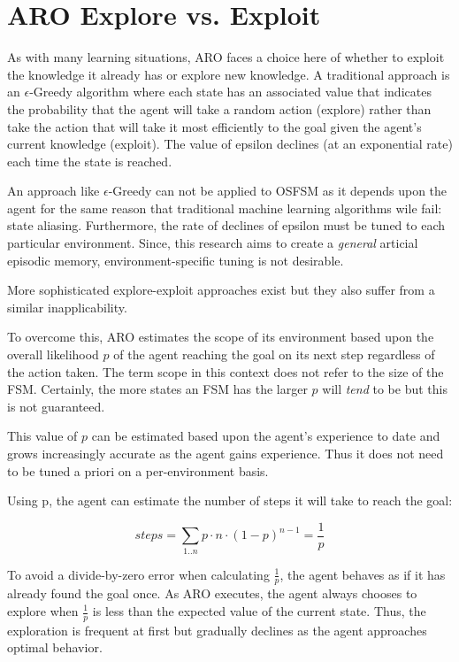 \documentclass[letterpaper]{article} %
\begin{document}
\section{ARO Explore vs. Exploit}

   
As with many learning situations, ARO faces a choice here of whether
to exploit the knowledge it already has or explore new knowledge.  A
traditional approach is an $\epsilon$-Greedy algorithm where each state
has an associated value that indicates the probability that the agent
will take a random action (explore) rather than take the action that
will take it most efficiently to the goal given the agent's current
knowledge (exploit).  The value of epsilon declines (at an exponential
rate) each time the state is reached.

An approach like $\epsilon$-Greedy can not be applied to OSFSM as it
depends upon the agent for the same reason that traditional machine
learning algorithms wile fail: state aliasing.  Furthermore, the rate
of declines of epsilon must be tuned to each particular environment.
Since, this research aims to create a \textit{general} articial
episodic memory, environment-specific tuning is not desirable.

More sophisticated explore-exploit approaches exist \cite{Kearns99,Brafman02}
but they also suffer from a similar inapplicability.


To overcome this, ARO estimates the scope of its environment based
upon the overall likelihood $p$ of the agent reaching the goal on its
next step regardless of the action taken.  The term scope in this
context does not refer to the size of the FSM.  Certainly, the more
states an FSM has the larger $p$ will \textit{tend} to be but this is
not guaranteed.

This value of $p$ can be estimated based upon the agent's experience
to date and grows increasingly accurate as the agent gains
experience.  Thus it does not need to be tuned a priori on a
per-environment basis.

Using p, the agent can estimate the number of steps it will take to
reach the goal:

\begin{center}
     $$steps = \sum_{1..n} p \cdot n \cdot (1-p)^{n-1}  = \frac{1}{p}$$
\end{center}


To avoid a divide-by-zero error when calculating $\frac{1}{p}$, the
agent behaves as if it has already found the goal once.  As ARO
executes, the agent always chooses to explore when $\frac{1}{p}$ is
less than the expected value of the current state.  Thus, the
exploration is frequent at first but gradually declines as the agent
approaches optimal behavior.
\end{document}
